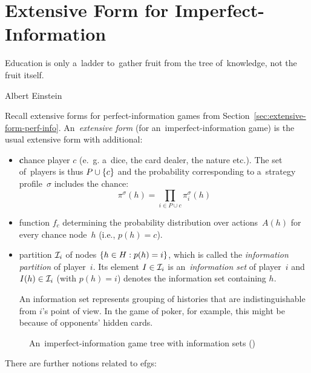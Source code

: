 \section{Extensive Form for Imperfect-Information}
\label{sec:extensive-form-imperf-info}
\epigraph{
  Education is only a~ladder to~gather fruit from the tree of~knowledge, not the fruit itself.
}{Albert Einstein}
Recall extensive forms for perfect-information games from Section~\ref{sec:extensive-form-perf-info}.
An~\emph{extensive form} (for an~imperfect-information game) is the usual extensive form with additional:
\begin{itemize}
  \item \textbf{c}hance player $c$ (e.~g. a~dice, the card dealer, the nature etc.).
    The set of~players is thus $P \cup \left\{ c \right\}$ and the probability corresponding to a~strategy profile~$\sigma$ includes the chance:
    \[\pi ^\sigma(h) = \prod _{i \in P \cup {c}} \pi _i ^\sigma (h)\]

  \item function $f_c$ determining the probability distribution over actions~$A(h)$ for every chance node~$h$ (i.e., $p(h) = c$).

  \item partition $\mathcal{I}_i$ of nodes $\left\{ h \in H: p(h) = i \right\}$, which is called the \emph{information partition} of player~$i$.
    Its element $I \in \mathcal{I}_i$ is an~\emph{information set} of player~$i$ and $I(h) \in \mathcal{I}_i$ (with $p(h) = i$) denotes the information set containing $h$.

    An information set represents grouping of histories that are indistinguishable from $i$'s point of view.
    In the game of poker, for example, this might be because of  opponents' hidden cards.
\end{itemize}
\noindent
\begin{figure}[H]
  \centering
  \scriptsize
  \def\svgwidth{.7\textwidth}
  
  \def\captionTitle{An~imperfect-information game tree with information sets}
  \caption[\captionTitle]{\captionTitle{} (\cite[p.~67]{AGT07})}
  \label{fig:strategic-form-tree}
\end{figure}
\noindent
There are further notions related to \acrshort{efg}s:
